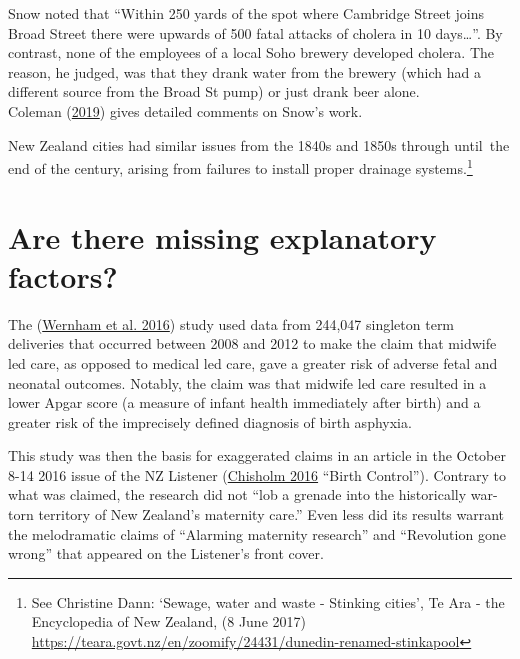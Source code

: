 \documentclass[
  10pt,
  b5paper]{book}
\begin{document}
Snow noted that ``Within 250 yards of the spot where Cambridge
Street joins Broad Street there were upwards of 500 fatal
attacks of cholera in 10 days\ldots{}''. By contrast, none of the
employees of a local Soho brewery developed cholera.
The reason, he judged, was that they drank water from
the brewery (which had a different source from the Broad
St pump) or just drank beer alone.\\
Coleman (\protect\hyperlink{ref-coleman2019causality}{2019}) gives detailed comments on Snow's work.

New Zealand cities had similar issues from the 1840s
and 1850s through until~the end of the century, arising
from failures to install proper
drainage systems.\footnote{See Christine Dann: `Sewage, water and
  waste - Stinking cities', Te Ara - the Encyclopedia of New
  Zealand, (8 June 2017) \url{https://teara.govt.nz/en/zoomify/24431/dunedin-renamed-stinkapool}}

\hypertarget{sec:maternity}{%
\section{Are there missing explanatory factors?}\label{sec:maternity}}

The (\protect\hyperlink{ref-wernham_EtAl_2016}{Wernham et al. 2016}) study used data from 244,047 singleton
term deliveries that occurred between 2008 and 2012 to make the
claim that midwife led care, as opposed to medical led care, gave a
greater risk of adverse fetal and neonatal outcomes. Notably, the
claim was that midwife led care resulted in a lower Apgar score
(a measure of infant health immediately after birth) and a greater
risk of the imprecisely defined diagnosis of birth asphyxia.

This study was then the basis for exaggerated claims in an article
in the October 8-14 2016 issue of the NZ Listener
(\protect\hyperlink{ref-chisholm_2016}{Chisholm 2016} ``Birth Control''). Contrary to what was
claimed, the research did not
``lob a grenade into the historically war-torn territory of
New Zealand's maternity care.''
Even less did its results warrant the melodramatic claims of
``Alarming maternity research'' and ``Revolution gone wrong'' that
appeared on the Listener's front cover.
\end{document}
